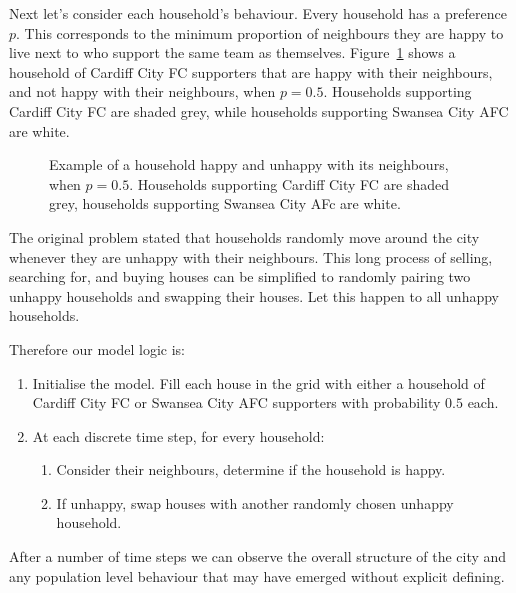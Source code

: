 Next let's consider each household's behaviour.
Every household has a preference $p$.
This corresponds to the minimum proportion of neighbours they are happy to live
next to who support the same team as themselves.
Figure~\ref{fig:schelling_happyunhappy} shows a household of Cardiff City FC
supporters that are happy with their neighbours, and not happy with their
neighbours, when $p=0.5$. Households supporting Cardiff City FC are shaded grey,
while households supporting Swansea City AFC are white.

\begin{figure}
\begin{center}
\subfigure[A happy household, with 6 similar neighbours ($\frac{6}{8} > p = 0.5$)]{}
\subfigure[An unhappy household, with 2 similar neighbours ($\frac{2}{8} < p = 0.5$)]{}
\end{center}
\caption{Example of a household happy and unhappy with its neighbours, when
$p=0.5$. Households supporting Cardiff City FC are shaded grey, households
supporting Swansea City AFc are white.}
\label{fig:schelling_happyunhappy}
\end{figure}

The original problem stated that households randomly move around the city
whenever they are unhappy with their neighbours.
This long process of selling, searching for, and buying houses can be simplified
to randomly pairing two unhappy households and swapping their houses.
Let this happen to all unhappy households.

Therefore our model logic is:

\begin{enumerate}
  \item Initialise the model. Fill each house in the grid with either a
  household of Cardiff City FC or Swansea City AFC supporters with
  probability $0.5$ each.
  \item At each discrete time step, for every household:
  \begin{enumerate}
    \item Consider their neighbours, determine if the household is happy.
    \item If unhappy, swap houses with another randomly chosen unhappy
    household.
  \end{enumerate}
\end{enumerate}

After a number of time steps we can observe the overall structure of the city
and any population level behaviour that may have emerged without explicit
defining.

